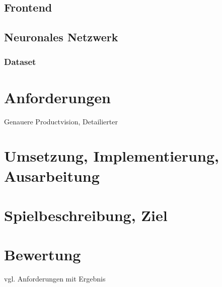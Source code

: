 \documentclass[11pt]{article}
\begin{document}
\subsection{Frontend}
\subsection{Neuronales Netzwerk}
\subsubsection{Dataset}
\section{Anforderungen}
Genauere Productvision, Detailierter
\section{Umsetzung, Implementierung, Ausarbeitung}
\section{Spielbeschreibung, Ziel}
\section{Bewertung}
vgl. Anforderungen mit Ergebnis

\pagebreak
\printbibliography
\end{document}
